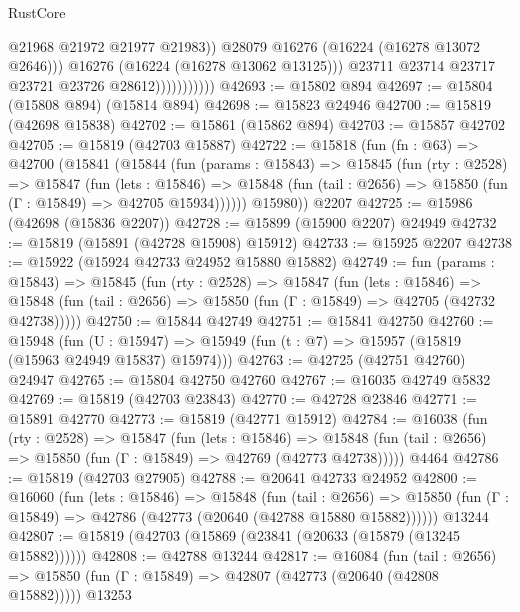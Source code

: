 \begin{lexlean}{RustCore}
\begin{coremodule}
                                  @21968
                                  @21972
                                  @21977
                                  @21983))
                              @28079
                              @16276
                              (@16224 (@16278 @13072 @2646)))
                            @16276
                            (@16224 (@16278 @13062 @13125)))
                          @23711
                          @23714
                          @23717
                          @23721
                          @23726
                          @28612)))))))))))
@42693 := @15802 @894
@42697 := @15804 (@15808 @894) (@15814 @894)
@42698 := @15823 @24946
@42700 := @15819 (@42698 @15838)
@42702 := @15861 (@15862 @894)
@42703 := @15857 @42702
@42705 := @15819 (@42703 @15887)
@42722 := @15818
    (fun (fn : @63) =>
    @42700
      (@15841
        (@15844
          (fun (params : @15843) =>
          @15845
            (fun (rty : @2528) =>
            @15847
              (fun (lets : @15846) =>
              @15848 (fun (tail : @2656) => @15850 (fun (Γ : @15849) => @42705 @15934))))))
        @15980))
    @2207
@42725 := @15986 (@42698 (@15836 @2207))
@42728 := @15899 (@15900 @2207) @24949
@42732 := @15819 (@15891 (@42728 @15908) @15912)
@42733 := @15925 @2207
@42738 := @15922 (@15924 @42733 @24952 @15880 @15882)
@42749 := fun (params : @15843) =>
  @15845
    (fun (rty : @2528) =>
    @15847
      (fun (lets : @15846) =>
      @15848 (fun (tail : @2656) => @15850 (fun (Γ : @15849) => @42705 (@42732 @42738)))))
@42750 := @15844 @42749
@42751 := @15841 @42750
@42760 := @15948
    (fun (U : @15947) => @15949 (fun (t : @7) => @15957 (@15819 (@15963 @24949 @15837) @15974)))
@42763 := @42725 (@42751 @42760) @24947
@42765 := @15804 @42750 @42760
@42767 := @16035 @42749 @5832
@42769 := @15819 (@42703 @23843)
@42770 := @42728 @23846
@42771 := @15891 @42770
@42773 := @15819 (@42771 @15912)
@42784 := @16038
    (fun (rty : @2528) =>
    @15847
      (fun (lets : @15846) =>
      @15848 (fun (tail : @2656) => @15850 (fun (Γ : @15849) => @42769 (@42773 @42738)))))
    @4464
@42786 := @15819 (@42703 @27905)
@42788 := @20641 @42733 @24952
@42800 := @16060
    (fun (lets : @15846) =>
    @15848
      (fun (tail : @2656) =>
      @15850 (fun (Γ : @15849) => @42786 (@42773 (@20640 (@42788 @15880 @15882))))))
    @13244
@42807 := @15819 (@42703 (@15869 (@23841 (@20633 (@15879 (@13245 @15882))))))
@42808 := @42788 @13244
@42817 := @16084
    (fun (tail : @2656) => @15850 (fun (Γ : @15849) => @42807 (@42773 (@20640 (@42808 @15882)))))
    @13253

\end{coremodule}
\end{lexlean}

